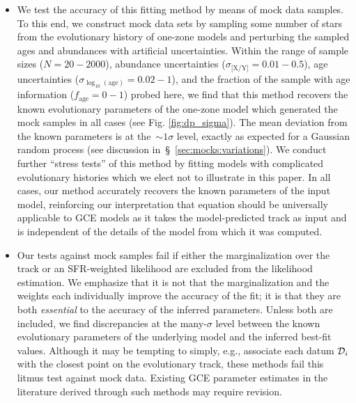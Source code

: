 \documentclass[ms.tex]{subfiles}
\begin{document}
\begin{itemize}
	\item We test the accuracy of this fitting method by means of mock data
	samples.
	To this end, we construct mock data sets by sampling some number of stars
	from the evolutionary history of one-zone models and perturbing the sampled
	ages and abundances with artificial uncertainties.
	Within the range of sample sizes ($N = 20 - 2000$), abundance uncertainties
	($\sigma_\text{[X/Y]} = 0.01 - 0.5$), age uncertainties
	($\sigma_{\log_{10}(\text{age})} = 0.02 - 1$), and the fraction of the
	sample with age information ($f_\text{age} = 0 - 1$) probed here, we find
	that this method recovers the known evolutionary parameters of the one-zone
	model which generated the mock samples in all cases (see Fig.
	\ref{fig:dp_sigma}).
	The mean deviation from the known parameters is at the~$\sim1\sigma$ level,
	exactly as expected for a Gaussian random process (see discussion
	in~\S~\ref{sec:mocks:variations}).
	We conduct further ``stress tests'' of this method by fitting models with
	complicated evolutionary histories which we elect not to illustrate in this
	paper.
	In all cases, our method accurately recovers the known parameters of the
	input model, reinforcing our interpretation that equation
	 should be universally applicable to GCE models as it
	takes the model-predicted track as input and is independent of the details
	of the model from which it was computed.

	\item Our tests against mock samples fail if either the marginalization
	over the track or an SFR-weighted likelihood are excluded from the
	likelihood estimation.
	We emphasize that it is not that the marginalization and the weights each
	individually improve the accuracy of the fit; it is that they are both
	\textit{essential} to the accuracy of the inferred parameters.
	Unless both are included, we find discrepancies at the many-$\sigma$ level
	between the known evolutionary parameters of the underlying model and the
	inferred best-fit values.
	Although it may be tempting to simply, e.g., associate each datum
	$\mathcal{D}_i$ with the closest point on the evolutionary track, these
	methods fail this litmus test against mock data.
	Existing GCE parameter estimates in the literature derived through such
	methods may require revision.


\end{itemize}
\end{document}
